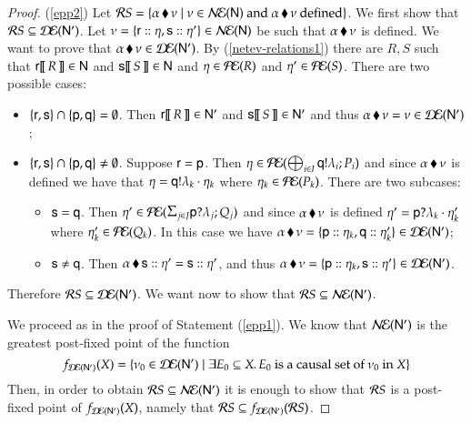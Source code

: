 \begin{proof}
(\ref{epp2}) Let ${\mathcal RS}=\{{\alpha}\,\blacklozenge\,{\nu}\mid\nu\in
  \mathcal{N\!E}({\sf N})\text{ and }{\alpha}\,\blacklozenge\,{\nu}\text{ defined} \}$.  We first
show that ${\mathcal RS}\subseteq\mathcal{D\!E}({\sf N}')$.  Let
$\nu=\{{\sf r}:: \eta, {\sf s}:: \eta'\} \in \mathcal{N\!E}({\sf N})$
be such that ${\alpha}\,\blacklozenge\,{\nu}$ is defined. We want to prove that
${\alpha}\,\blacklozenge\,{\nu}\in\mathcal{D\!E}({\sf N}')$.  By
(\ref{netev-relations1}) there are $R,S$
such that ${\sf r}[\![\,R\,]\!]\in{\sf N}$ and ${\sf s}[\![\,S\,]\!]\in{\sf N}$ and $\eta\in
\mathcal{P\!E}(R)$ and $\eta'\in \mathcal{P\!E}(S)$.
%
There are two possible cases:
\begin{itemize}
\item
$\{{\sf r},{\sf s}\} \cap \{{\sf p},{\sf q}\} = \emptyset$. Then
${\sf r}[\![\,R\,]\!]\in{\sf N}'$ and ${\sf s}[\![\,S\,]\!]\in{\sf N}'$ and thus ${\alpha}\,\blacklozenge\,{\nu} = \nu \in\mathcal{D\!E}({\sf N}')$;
\item $\{{\sf r},{\sf s}\} \cap \{{\sf p},{\sf q}\} \neq \emptyset$. 
Suppose ${\sf r} = {\sf p}$. 
Then $\eta\in\mathcal{P\!E}(\bigoplus_{i\in I}{\sf q}!\lambda_i;P_i)$ and since  ${\alpha}\,\blacklozenge\,{\nu}$ is defined we have that
$\eta={\sf q}!\lambda_k\cdot\eta_{k}$ where $\eta_k\in\mathcal{P\!E}(P_k)$.
There are two subcases:
\begin{itemize}
\item {} ${\sf s} = {\sf q}$. Then $\procev'\in\ES(\inp\pp{j}{J}{\la}{\Q})$ 
and since  ${\alpha}\,\blacklozenge\,{\nu}$ is defined
  $\eta'={{\sf p}?\lambda_k\cdot\eta'_{k}}$ where $\eta'_k\in\mathcal{P\!E}(Q_k)$. In
  this case we have ${\alpha}\,\blacklozenge\,{\nu} = \{{\sf p}:: \eta_{k}, {\sf q}:: \eta'_{k}\} \in \mathcal{D\!E}({\sf N}')$;
%
\item {} ${\sf s} \neq {\sf q}$. Then ${\alpha}\,\blacklozenge\,{{\sf s}:: \eta'} =
{\sf s}:: \eta'$, and thus ${\alpha}\,\blacklozenge\,{\nu} =
\{{\sf p}:: \eta_k, {\sf s}:: \eta'\} \in \mathcal{D\!E}({\sf N}')$.
\end{itemize}
\end{itemize}
Therefore ${\mathcal RS}\subseteq\mathcal{D\!E}({\sf N}')$. We want now to show that
${\mathcal RS}\subseteq\mathcal{N\!E}({\sf N}')$.



We proceed as in the proof of Statement (\ref{epp1}). We know that
$\mathcal{N\!E}({\sf N}')$ is the greatest post-fixed point of the function
\[ 
f_{\mathcal{D\!E}({{\sf N}'})}(X) = \{\nu_0\in \mathcal{D\!E}({\sf N}') \mid
    \exists E_0 \subseteq X. \, E_0 ~\text{is a causal set of }
    \nu_0 \text{ in } X\}
    \]
%
Then, in order to obtain ${\mathcal RS} \subseteq \mathcal{N\!E}({\sf N}')$ it is enough to
show that ${\mathcal RS}$ is a post-fixed point of
$f_{\mathcal{D\!E}({{\sf N}'})}(X)$, namely that ${\mathcal RS} \subseteq f_{\mathcal{D\!E}({{\sf N}'})}({\mathcal RS})$.  


\end{proof}

